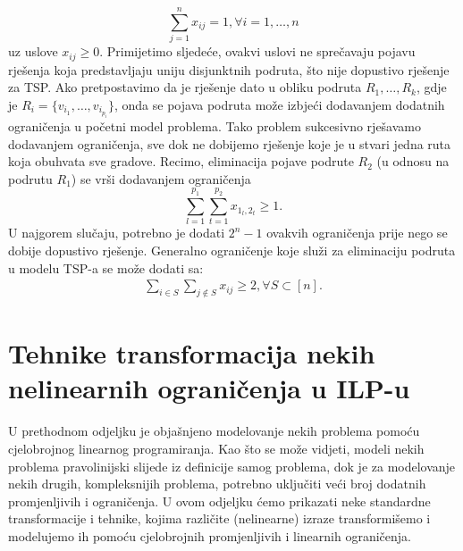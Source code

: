 \documentclass[a4paper, utf8, 11pt, colorlinks]{book}
\theoremstyle{definition}
\begin{document}
$$  \sum_{j=1}^n x_{ij} = 1, \forall i =1,\ldots, n$$ 
 uz uslove $x_{ij}\geq 0$. Primijetimo sljedeće, ovakvi uslovi ne sprečavaju pojavu rješenja koja predstavljaju uniju disjunktnih podruta, što nije dopustivo rješenje za TSP. Ako pretpostavimo da je rješenje dato u obliku podruta $R_1, \ldots, R_k$, gdje je $R_i = \{ v_{i_1}, \ldots, v_{i_{p_i}} \}$, onda se pojava podruta  može izbjeći  dodavanjem dodatnih ograničenja u početni model problema. Tako problem sukcesivno rješavamo dodavanjem ograničenja, sve dok ne dobijemo rješenje koje je u stvari jedna ruta koja obuhvata sve gradove. Recimo, eliminacija pojave podrute $R_2$ (u odnosu na podrutu $R_1$) se vrši dodavanjem ograničenja
 $$ \sum_{l=1}^{ {p_1}}\sum_{t=1}^{ {p_2}} x_{1_l, 2_t} \geq 1.$$
 U najgorem slučaju, potrebno je dodati $2^n-1$ ovakvih ograničenja prije nego se dobije dopustivo rješenje. 
 Generalno ograničenje koje služi za eliminaciju podruta u modelu TSP-a se može dodati sa:
 \begin{align}
 	  \sum_{i \in S} \sum_{j \notin S} x_{ij} \geq 2, \forall S \subset [n].
 \end{align}
 
 \section{Tehnike transformacija nekih nelinearnih ograničenja u  ILP-u}\label{sec:transformILP}
 U prethodnom odjeljku je objašnjeno modelovanje nekih problema pomoću cjelobrojnog linearnog programiranja. Kao što se može vidjeti, modeli nekih problema pravolinijski slijede iz definicije samog problema, dok je za modelovanje nekih drugih, kompleksnijih problema, potrebno uključiti veći broj dodatnih promjenljivih i ograničenja. U ovom odjeljku ćemo prikazati neke standardne transformacije i tehnike, kojima različite (nelinearne) izraze transformišemo i modelujemo ih pomoću cjelobrojnih promjenljivih i linearnih ograničenja.
 
  
 
\end{document}
